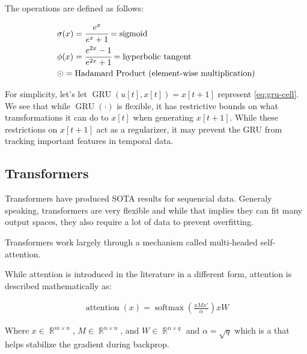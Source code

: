 \documentclass{article}
\DeclareMathOperator{\R}{\mathbb{R}}
\DeclareMathOperator{\GRU}{\text{GRU}}
\DeclareMathOperator{\softmax}{\text{softmax}}
\DeclareMathOperator{\attention}{\text{attention}}
\numberwithin{equation}{subsection}
\begin{document}
The operations are defined as follows:

\begin{align*}
  &\sigma(x) = \cfrac{e^x}{e^x + 1} = \text{sigmoid}\\
  &\phi(x) = \cfrac{e^{2x}-1}{e^{2x} + 1} = \text{hyperbolic tangent} \\ 
  &\odot = \text{Hadamard Product (element-wise multiplication)}
\end{align*}

For simplicity, let's let $\GRU(u[t], x[t]) = x[t+1]$ represent \ref{eq:gru-cell}. We see that
while $\GRU(\cdot)$ is flexible, it has restrictive bounds on what transformations it can do to
$x[t]$ when generating $x[t+1]$. While these restrictions on $x[t+1]$ act as a regularizer, it
may prevent the GRU from tracking important features in temporal data.

\subsection{Transformers}

Transformers have produced SOTA results for sequencial data. Generaly speaking, transformers are very flexible
and while that implies they can fit many output spaces, they also require a lot of data to prevent overfitting.

Transformers work largely through a mechanism called multi-headed self-attention.

While attention is introduced in the literature in a different form, attention is
described mathematically as:

\begin{align}
  \attention(x) = \softmax \left(\frac{x M x'}{\alpha}\right)xW \label{eq:attention}
\end{align}

Where $x \in \R^{m \times n}$, $M \in \R^{n \times n}$, and $W \in \R^{n \times q}$ and $\alpha=\sqrt{q}$ which is a
that helps stabilize the gradient during backprop.  
\vspace{12pt}
\end{document}
